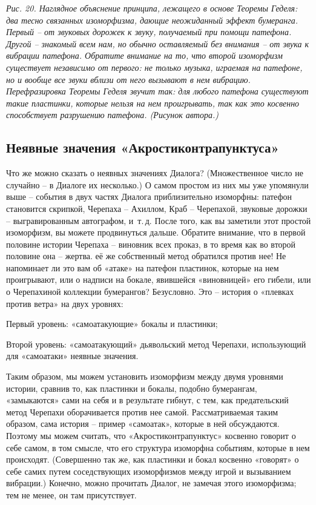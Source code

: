 \documentclass[../main.tex]{subfiles}
\begin{document}
\emph{Рис. 20. Наглядное объяснение принципа, лежащего в основе Теоремы Геделя: два тесно связанных изоморфизма, дающие неожиданный эффект бумеранга. Первый \--- от звуковых дорожек к звуку, получаемый при помощи патефона. Другой \--- знакомый всем нам, но обычно оставляемый без внимания \--- от звука к вибрации патефона. Обратите внимание на то, что второй изоморфизм существует независимо от первого: не только музыка, играемая на патефоне, но и вообще все звуки вблизи от него вызывают в нем вибрацию. Перефразировка Теоремы Геделя звучит так: для любого патефона существуют такие пластинки, которые нельзя на нем проигрывать, так как это косвенно способствует разрушению патефона. (Рисунок автора.)}


\subsection{Неявные значения «Акростиконтрапунктуса»}

Что же можно сказать о неявных значениях Диалога? (Множественное число не случайно \--- в Диалоге их несколько.) О самом простом из них мы уже упомянули выше \--- события в двух частях Диалога приблизительно изоморфны: патефон становится скрипкой, Черепаха \--- Ахиллом, Краб \--- Черепахой, звуковые дорожки \--- выгравированным автографом, и~т.\,д. После того, как вы заметили этот простой изоморфизм, вы можете продвинуться дальше. Обратите внимание, что в первой половине истории Черепаха \--- виновник всех проказ, в то время как во второй половине она \--- жертва. её же собственный метод обратился против нее! Не напоминает ли это вам об «атаке» на патефон пластинок, которые на нем проигрывают, или о надписи на бокале, явившейся «виновницей» его гибели, или о Черепахиной коллекции бумерангов? Безусловно. Это \--- история о «плевках против ветра» на двух уровнях:

\begin{block}
    Первый уровень: «самоатакующие» бокалы и пластинки;

    Второй уровень: «самоатакующий» дьявольский метод Черепахи, использующий для «самоатаки» неявные значения.
\end{block}

Таким образом, мы можем установить изоморфизм между двумя уровнями истории, сравнив то, как пластинки и бокалы, подобно бумерангам, «замыкаются» сами на себя и в результате гибнут, с тем, как предательский метод Черепахи оборачивается против нее самой. Рассматриваемая таким образом, сама история \--- пример «самоатак», которые в ней обсуждаются. Поэтому мы можем считать, что «Акростиконтрапунктус» косвенно говорит о себе самом, в том смысле, что его структура изоморфна событиям, которые в нем происходят. (Совершенно так же, как пластинки и бокал косвенно «говорят» о себе самих путем соседствующих изоморфизмов между игрой и вызыванием вибрации.) Конечно, можно прочитать Диалог, не замечая этого изоморфизма; тем не менее, он там присутствует.
\end{document}
